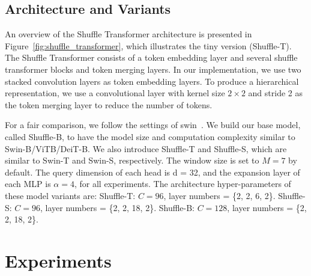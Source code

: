 \documentclass{article}
\begin{document}
\subsection{Architecture and Variants}
An overview of the Shuffle Transformer architecture is presented in Figure~\ref{fig:shuffle_transformer}, which illustrates the tiny version (Shuffle-T). The Shuffle Transformer consists of a token embedding layer and several shuffle transformer blocks and token merging layers. In our implementation, we use two stacked convolution layers as token embedding layers. To produce a hierarchical representation, we use a convolutional layer with kernel size $2\times2$ and stride 2 as the token merging layer to reduce the number of tokens.

For a fair comparison, we follow the settings of swin~\cite{liu2021Swin}. We build our base model, called Shuffle-B, to have the model size and computation complexity similar to Swin-B/ViTB/DeiT-B. We also introduce Shuffle-T and Shuffle-S,
which are similar to Swin-T and Swin-S, respectively. The
window size is set to $M = 7$ by default. The query dimension of each head is d = 32, and the expansion layer of
each MLP is $\alpha = 4$, for all experiments. The architecture
hyper-parameters of these model variants are: Shuffle-T: $C = 96$, layer numbers = \{2, 2, 6, 2\}. Shuffle-S: $C = 96$, layer numbers = \{2, 2, 18, 2\}. Shuffle-B: $C = 128$, layer numbers = \{2, 2, 18, 2\}. 

\section{Experiments}
\end{document}
